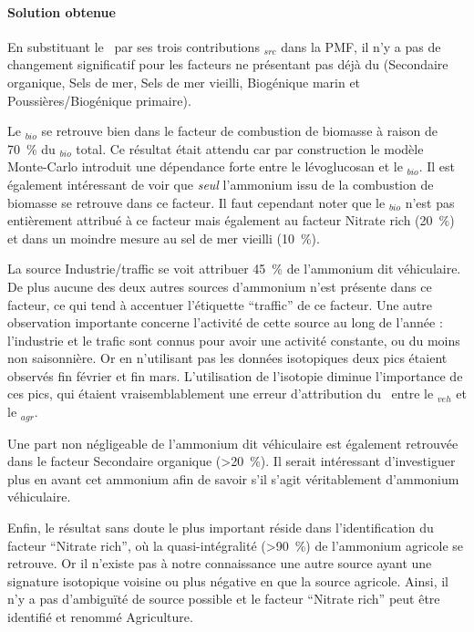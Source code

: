 \paragraph{Solution obtenue}%
\label{par:solution_obtenue}

En substituant le \NHq~par ses trois contributions \NHq$_{src}$ dans la PMF, il n'y a pas
de changement significatif pour les facteurs ne présentant pas déjà du \NHq (Secondaire
organique, Sels de mer, Sels de mer vieilli, Biogénique marin et Poussières/Biogénique
primaire).

Le \NHq$_{bio}$ se retrouve bien dans le facteur de combustion de biomasse à raison de
\SI{70}{\percent} du \NHq$_{bio}$ total.
Ce résultat était attendu car par construction le modèle Monte-Carlo introduit une
dépendance forte entre le lévoglucosan et le \NHq$_{bio}$.
Il est également intéressant de voir que \textit{seul} l'ammonium issu de la combustion
de biomasse se retrouve dans ce facteur.
Il faut cependant noter que le \NHq$_{bio}$ n'est pas entièrement attribué à ce facteur
mais également au facteur \og Nitrate rich \fg{} (\SI{20}{\percent}) et dans un moindre mesure au sel
de mer vieilli (\SI{10}{\percent}).

La source Industrie/traffic se voit attribuer \SI{45}{\percent} de l'ammonium dit véhiculaire.
De plus aucune des deux autres sources d'ammonium n'est présente dans ce facteur, ce qui
tend à accentuer l'étiquette ``traffic'' de ce facteur.
Une autre observation importante concerne l'activité de cette source au long de l'année :
l'industrie et le trafic sont connus pour avoir une activité constante, ou du moins non
saisonnière.
Or en n'utilisant pas les données isotopiques deux pics étaient observés fin février et
fin mars.
L'utilisation de l'isotopie diminue l'importance de ces pics, qui étaient
vraisemblablement une erreur d'attribution du \NHq~entre le \NHq$_{veh}$ et le
\NHq$_{agr}$.

Une part non négligeable de l'ammonium dit véhiculaire est également retrouvée dans le
facteur Secondaire organique (\SI{>20}{\percent}).
Il serait intéressant d'investiguer plus en avant cet ammonium afin de savoir s'il s'agit
véritablement d'ammonium véhiculaire.

Enfin, le résultat sans doute le plus important réside dans l'identification du facteur
``Nitrate rich'', où la quasi-intégralité (\SI{>90}{\percent}) de l'ammonium agricole se retrouve.
Or il n'existe pas à notre connaissance une autre source ayant une signature isotopique
voisine ou plus négative en \dN{} que la source agricole.
Ainsi, il n'y a pas d'ambiguïté de source possible et le facteur ``Nitrate rich''
peut être identifié et renommé Agriculture.

